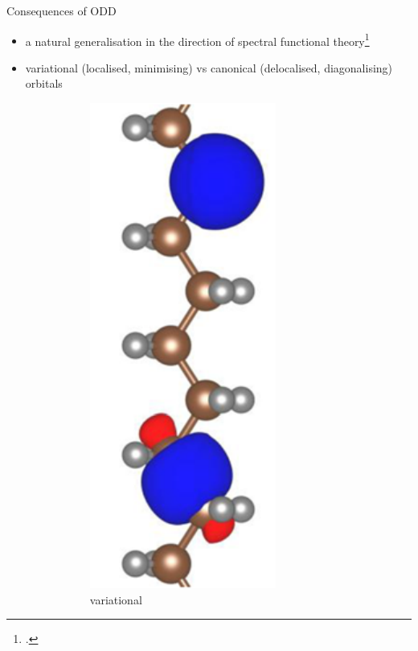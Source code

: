 \documentclass[xcolor=table,aspectratio=169]{beamer}
\numberwithin{equation}{section}
\begin{document}
\begin{frame}{Consequences of ODD}
   \begin{itemize}
      \item a natural generalisation in the direction of spectral functional theory\footcite{Ferretti2014}
      \item variational (localised, minimising) vs canonical (delocalised, diagonalising) orbitals
            \begin{figure}[t]
               \centering
               \begin{subfigure}{0.3\textwidth}
                  \includegraphics[height=\columnwidth,angle=90]{figures/fig_nguyen_variational_orbital.png}
                  \caption{variational}
               \end{subfigure}
               \hspace{0.1\textwidth}
               \begin{subfigure}{0.3\textwidth}

\end{subfigure}
\end{figure}
\end{itemize}
\end{frame}
\end{document}
